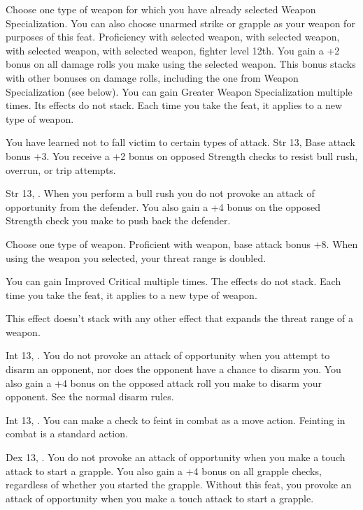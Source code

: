 {Choose one type of weapon for which you have already selected Weapon Specialization. You can also choose unarmed strike or grapple as your weapon for purposes of this feat.}
{Proficiency with selected weapon,  with selected weapon,  with selected weapon,  with selected weapon, fighter level 12th.}
{You gain a +2 bonus on all damage rolls you make using the selected weapon. This bonus stacks with other bonuses on damage rolls, including the one from Weapon Specialization (see below).}{}
{You can gain Greater Weapon Specialization multiple times. Its effects do not stack. Each time you take the feat, it applies to a new type of weapon.}

{You have learned not to fall victim to certain types of attack.}
{Str 13, Base attack bonus +3.}
{You receive a +2 bonus on opposed Strength checks to resist bull rush, overrun, or trip attempts.}{}{}

{}
{Str 13, .}
{When you perform a bull rush you do not provoke an attack of opportunity from the defender. You also gain a +4 bonus on the opposed Strength check you make to push back the defender.}{}{}

{Choose one type of weapon.}
{Proficient with weapon, base attack bonus +8.}
{When using the weapon you selected, your threat range is doubled.}{}
{You can gain Improved Critical multiple times. The effects do not stack. Each time you take the feat, it applies to a new type of weapon.

This effect doesn't stack with any other effect that expands the threat range of a weapon.}{}

{}
{Int 13, .}
{You do not provoke an attack of opportunity when you attempt to disarm an opponent, nor does the opponent have a chance to disarm you. You also gain a +4 bonus on the opposed attack roll you make to disarm your opponent.}
{See the normal disarm rules.}{}

{}
{Int 13, .}
{You can make a  check to feint in combat as a move action.}
{Feinting in combat is a standard action.}{}

{}
{Dex 13, .}
{You do not provoke an attack of opportunity when you make a touch attack to start a grapple. You also gain a +4 bonus on all grapple checks, regardless of whether you started the grapple.}
{Without this feat, you provoke an attack of opportunity when you make a touch attack to start a grapple.}{}

